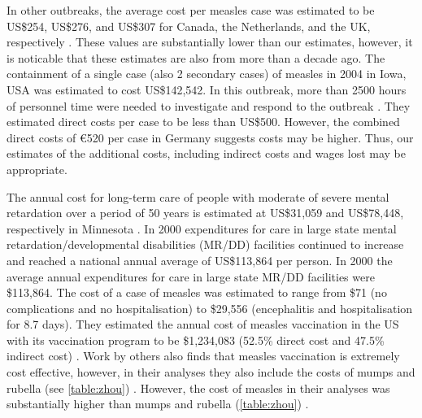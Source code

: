 \documentclass{article}
\begin{document}
In other outbreaks, the average cost per measles case was estimated to be US\$254, US\$276, and US\$307 for Canada, the Netherlands, and the UK, respectively  \citep{carabin2}. These values are substantially lower than our estimates, however, it is noticable that these estimates are also from more than a decade ago. The containment of a single case (also 2 secondary cases) of measles in 2004 in Iowa, USA was estimated to cost US\$142,542. In this outbreak, more than 2500 hours of personnel time were needed to investigate and respond to the outbreak \citep{dayan5}. They estimated direct costs per case to be less than US\$500. However, the combined direct costs of \euro 520 per case in Germany \citep{siedler6} suggests costs may be higher. Thus, our estimates of the additional costs, including indirect costs and wages lost may be appropriate.

The annual cost for long-term care of people with moderate of severe mental retardation over a period of 50 years is estimated at US\$31,059 and US\$78,448, respectively in Minnesota \citep{prouty1}. In 2000 expenditures for care in large state mental retardation/developmental disabilities (MR/DD) facilities continued to increase and reached a national annual average of US\$113,864 per person. In 2000 the average annual expenditures for care in large state MR/DD facilities were \$113,864. The cost of a case of measles was estimated to range from \$71 (no complications and no hospitalisation) to \$29,556 (encephalitis and hospitalisation for 8.7 days). They estimated the annual cost of measles vaccination in the US with its vaccination program to be \$1,234,083 (52.5\% direct cost and 47.5\% indirect cost) \citep{zhou4}. Work by others also finds that measles vaccination is extremely cost effective, however, in their analyses they also include the costs of mumps and rubella (see \autoref{table:zhou}) \citep{zhou4}. However, the cost of measles in their analyses was substantially higher than mumps and rubella (\autoref{table:zhou}) \citep{zhou4}.
\end{document}

